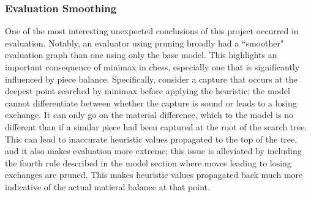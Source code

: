 \documentclass[letterpaper]{article}
\begin{document}
\subsubsection{Evaluation Smoothing}
One of the most interesting unexpected conclusions of this project occurred in evaluation.  Notably, an evaluator using pruning broadly had a ``smoother" evaluation graph than one using only the base model.  This highlights an important consequence of minimax in chess, especially one that is significantly influenced by piece balance.  Specifically, consider a capture that occurs at the deepest point searched by minimax before applying the heuristic; the model cannot differentiate between whether the capture is sound or leads to a losing exchange.  It can only go on the material difference, which to the model is no different than if a similar piece had been captured at the root of the search tree.  This can lead to inaccurate heuristic values propagated to the top of the tree, and it also makes evaluation more extreme; this issue is alleviated by including the fourth rule described in the model section where moves leading to losing exchanges are pruned.  This makes heuristic values propagated back much more indicative of the actual matieral balance at that point.
\end{document}

